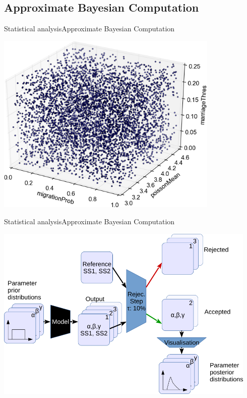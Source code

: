 \documentclass[10pt, aspectratio=43]{beamer}
\begin{document}
\subsection{Approximate Bayesian Computation}
\begin{frame}{Statistical analysis}{Approximate Bayesian Computation}
\begin{center}
  \includegraphics[width=0.8\textwidth]{../data/abc-space.png}
\end{center}
\end{frame}

\begin{frame}{Statistical analysis}{Approximate Bayesian Computation}
\begin{center}
  \includegraphics[width=0.94\textwidth]{../data/abc-landscape.png}
\end{center}
\end{frame}
\end{document}
